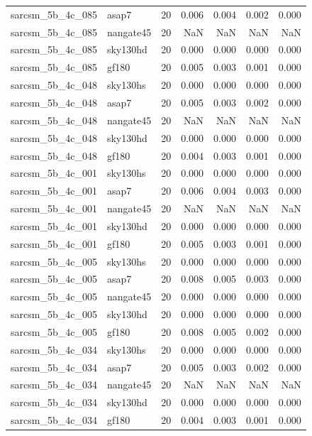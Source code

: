 \begin{tabular}{llrrrrr}
sarcsm\_5b\_4c\_085 & asap7 & 20 & 0.006 & 0.004 & 0.002 & 0.000 \\
sarcsm\_5b\_4c\_085 & nangate45 & 20 & NaN & NaN & NaN & NaN \\
sarcsm\_5b\_4c\_085 & sky130hd & 20 & 0.000 & 0.000 & 0.000 & 0.000 \\
sarcsm\_5b\_4c\_085 & gf180 & 20 & 0.005 & 0.003 & 0.001 & 0.000 \\
sarcsm\_5b\_4c\_048 & sky130hs & 20 & 0.000 & 0.000 & 0.000 & 0.000 \\
sarcsm\_5b\_4c\_048 & asap7 & 20 & 0.005 & 0.003 & 0.002 & 0.000 \\
sarcsm\_5b\_4c\_048 & nangate45 & 20 & NaN & NaN & NaN & NaN \\
sarcsm\_5b\_4c\_048 & sky130hd & 20 & 0.000 & 0.000 & 0.000 & 0.000 \\
sarcsm\_5b\_4c\_048 & gf180 & 20 & 0.004 & 0.003 & 0.001 & 0.000 \\
sarcsm\_5b\_4c\_001 & sky130hs & 20 & 0.000 & 0.000 & 0.000 & 0.000 \\
sarcsm\_5b\_4c\_001 & asap7 & 20 & 0.006 & 0.004 & 0.003 & 0.000 \\
sarcsm\_5b\_4c\_001 & nangate45 & 20 & NaN & NaN & NaN & NaN \\
sarcsm\_5b\_4c\_001 & sky130hd & 20 & 0.000 & 0.000 & 0.000 & 0.000 \\
sarcsm\_5b\_4c\_001 & gf180 & 20 & 0.005 & 0.003 & 0.001 & 0.000 \\
sarcsm\_5b\_4c\_005 & sky130hs & 20 & 0.000 & 0.000 & 0.000 & 0.000 \\
sarcsm\_5b\_4c\_005 & asap7 & 20 & 0.008 & 0.005 & 0.003 & 0.000 \\
sarcsm\_5b\_4c\_005 & nangate45 & 20 & 0.000 & 0.000 & 0.000 & 0.000 \\
sarcsm\_5b\_4c\_005 & sky130hd & 20 & 0.000 & 0.000 & 0.000 & 0.000 \\
sarcsm\_5b\_4c\_005 & gf180 & 20 & 0.008 & 0.005 & 0.002 & 0.000 \\
sarcsm\_5b\_4c\_034 & sky130hs & 20 & 0.000 & 0.000 & 0.000 & 0.000 \\
sarcsm\_5b\_4c\_034 & asap7 & 20 & 0.005 & 0.003 & 0.002 & 0.000 \\
sarcsm\_5b\_4c\_034 & nangate45 & 20 & NaN & NaN & NaN & NaN \\
sarcsm\_5b\_4c\_034 & sky130hd & 20 & 0.000 & 0.000 & 0.000 & 0.000 \\
sarcsm\_5b\_4c\_034 & gf180 & 20 & 0.004 & 0.003 & 0.001 & 0.000 \\

\end{tabular}
